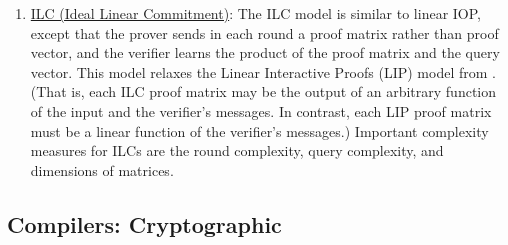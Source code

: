 \begin{enumerate}[label=\alph*.]
	\item{} \underline{ILC (Ideal Linear Commitment)}: 
	The ILC model is similar to linear IOP, except that the prover sends in each round a proof matrix rather than proof vector, and the verifier learns the product of the proof matrix and the query vector. 
	This model relaxes the Linear Interactive Proofs (LIP) model from \cite{2013:tcc:snargs-via-LIPs}. 
	(That is, each ILC proof matrix may be the output of an arbitrary function of the input and the verifier’s messages. In contrast, each LIP proof matrix must be a linear function of the verifier’s messages.) 
	Important complexity measures for ILCs are the round complexity, query complexity, and dimensions of matrices.
	
	\end{enumerate}


\subsection{Compilers: Cryptographic}
	
